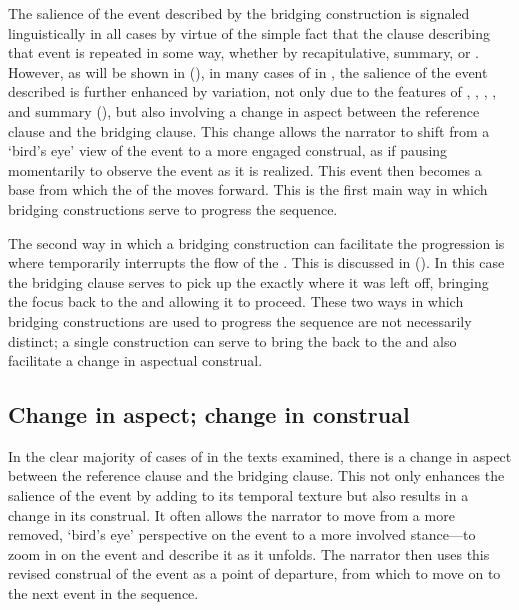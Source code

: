 \documentclass[output=paper]{LSP/langsci}
\begin{document}
The salience of the event described by the bridging construction is signaled linguistically in all cases by virtue of the simple fact that the clause describing that event is repeated in some way, whether by recapitulative, summary, or . However, as will be shown in  (), in many cases of  in , the salience of the event described is further enhanced by variation, not only due to the features of , , , , and summary (), but also involving a change in aspect between the reference clause and the bridging clause. This change allows the narrator to shift from a ‘bird’s eye’ view of the event to a more engaged construal, as if pausing momentarily to observe the event as it is realized. This event then becomes a base from which the  of the  moves forward. This  is the first main way in which bridging constructions serve to progress the  sequence.

The second way in which a bridging construction can facilitate the  progression is where  temporarily interrupts the flow of the . This is discussed in (). In this case the bridging clause serves to pick up the  exactly where it was left off, bringing the focus back to the  and allowing it to proceed. These two ways in which bridging constructions are used to progress the  sequence are not necessarily distinct; a single construction can serve to bring the  back to the  and also facilitate a change in aspectual construal.


\subsection{Change in aspect; change in construal}
\label{JaChange}
In the clear majority of cases of  in the  texts examined, there is a change in aspect between the reference clause and the bridging clause. This not only enhances the salience of the event by adding to its temporal texture but also results in a change in its construal. It often allows the narrator to move from a more removed, ‘bird’s eye’ perspective on the event to a more involved stance—to zoom in on the event and describe it as it unfolds. The narrator then uses this revised construal of the event as a point of departure, from which to move on to the next event in the  sequence. 
\end{document}
